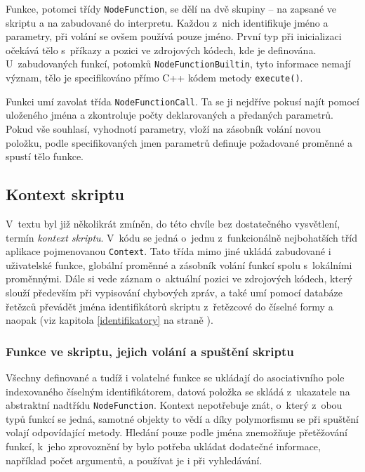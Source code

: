 \documentclass[11pt,twoside,a4paper]{book}
\begin{document}
Funkce, potomci třídy \texttt{NodeFunction}, se dělí na dvě skupiny -- na zapsané ve skriptu a na zabudované do interpretu. Každou z~nich identifikuje jméno a parametry, při volání se ovšem používá pouze jméno. První typ při inicializaci očekává tělo s~příkazy a pozici ve zdrojových kódech, kde je definována. U~zabudovaných funkcí, potomků \texttt{Node\-Function\-Builtin}, tyto informace nemají význam, tělo je specifikováno přímo C++ kódem metody \texttt{execute()}.

Funkci umí zavolat třída \texttt{NodeFunctionCall}. Ta se ji nejdříve pokusí najít pomocí uloženého jména a zkontroluje počty deklarovaných a předaných parametrů. Pokud vše souhlasí, vyhodnotí parametry, vloží na zásobník volání novou položku, podle specifikovaných jmen parametrů definuje požadované proměnné a spustí tělo funkce.


\subsection{Kontext skriptu}

V~textu byl již několikrát zmíněn, do této chvíle bez dostatečného vysvětlení, termín \textit{kontext skriptu}. V~kódu se jedná o~jednu z~funkcionálně nejbohatších tříd aplikace pojmenovanou \texttt{Context}. Tato třída mimo jiné ukládá zabudované i uživatelské funkce, globální proměnné a zásobník volání funkcí spolu s~lokálními proměnnými. Dále si vede záznam o~aktuální pozici ve zdrojových kódech, který slouží především při vypisování chybových zpráv, a také umí pomocí databáze řetězců převádět jména identifikátorů skriptu z~řetězcové do číselné formy a naopak (viz kapitola \ref{identifikatory} na straně \pageref{identifikatory}).


\subsubsection{Funkce ve skriptu, jejich volání a spuštění skriptu}

Všechny definované a tudíž i volatelné funkce se ukládají do asociativního pole indexovaného číselným identifikátorem, datová položka se skládá z~ukazatele na abstraktní nadtřídu \texttt{NodeFunction}. Kontext nepotřebuje znát, o~který z~obou typů funkcí se jedná, samotné objekty to vědí a díky polymorfismu se při spuštění volají odpovídající metody. Hledání pouze podle jména znemožňuje přetěžování funkcí, k~jeho zprovoznění by bylo potřeba ukládat dodatečné informace, na\-pří\-klad počet argumentů, a používat je i při vyhledávání.
\end{document}
